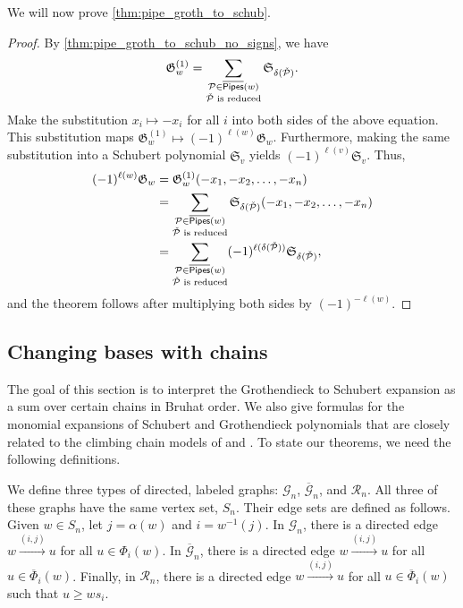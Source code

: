 \documentclass[12 pt]{amsart}
\newcommand{\addable}{\alpha}
\numberwithin{equation}{section}
\theoremstyle{remark}
\newcommand{\kpipes}{\overline{\sf Pipes}}
\newcommand{\demprod}{\delta}
\newcommand{\cotransitionperms}{\Phi}
\newcommand{\kcotransitionperms}{\overline{\Phi}}
\begin{document}
		We will now prove \cref{thm:pipe_groth_to_schub}.
		\thmpipeA*
		\begin{proof}
			By \cref{thm:pipe_groth_to_schub_no_signs}, we have \[\mathfrak{G}_w^{(1)} = \sum_{\substack{\mathcal{P} \in \kpipes(w)\\ \check{\mathcal{P}} \text{ is reduced}}}\mathfrak{S}_{\demprod(\check{\mathcal{P}})}.\]
			Make the substitution $x_i \mapsto -x_i$ for all $i$ into both sides of the above equation. 
			This substitution maps $\mathfrak{G}_w^{(1)} \mapsto (-1)^{\ell(w)}\mathfrak{G}_w$. 
			Furthermore, making the same substitution into a Schubert polynomial $\mathfrak S_v$ yields $(-1)^{\ell(v)}\mathfrak S_v$. 
			Thus, 
			\begin{align*}
			(-1)^{\ell(w)}\mathfrak{G}_w&=\mathfrak{G}_w^{(1)}(-x_1,-x_2,\ldots,-x_n)\\
			&=\sum_{\substack{\mathcal{P} \in \kpipes(w)\\ \check{\mathcal{P}} \text{ is reduced}}}\mathfrak{S}_{\demprod(\check{\mathcal{P}})}(-x_1,-x_2,\ldots,-x_n)\\
			&=\sum_{\substack{\mathcal{P} \in \kpipes(w)\\ \check{\mathcal{P}} \text{ is reduced}}}(-1)^{\ell(\demprod(\check{\mathcal{P}}))}\mathfrak{S}_{\demprod(\check{\mathcal{P}})},
			\end{align*}
			and the theorem follows after multiplying both sides by $(-1)^{-\ell(w)}$.
		\end{proof}
		
	
		
		\subsection{Changing bases with chains}
		\label{section:chains}
		
		The goal of this section is to interpret the Grothendieck to Schubert expansion as a sum over certain chains in Bruhat order. 
		We also give formulas for the monomial expansions of Schubert and Grothendieck polynomials that are closely related to the climbing chain models of \cite{Bergeron.Sottile} and \cite{Lenart.Robinson.Sottile}. 
		To state our theorems, we need the following definitions.
		
		We define three types of directed, labeled graphs: $\mathcal{G}_n$, $\overline{\mathcal{G}}_n$, and $\mathcal{R}_n$. 
		All three of these graphs have the same vertex set, $S_n$. 
		Their edge sets are defined as follows.
		Given $w\in S_n$, let $j=\addable(w)$ and $i=w^{-1}(j)$. 
		In $\mathcal{G}_n$, there is a directed edge $w\xrightarrow{(i,j)} u$ for all $u\in \cotransitionperms_i(w)$.
		In $\overline{\mathcal{G}}_n$, there is a directed edge $w\xrightarrow{(i,j)} u$ for all $u\in \kcotransitionperms_i(w)$.
		Finally, in $\mathcal{R}_n$, there is a directed edge $w\xrightarrow{(i,j)}u$ for all $u\in \kcotransitionperms_i(w)$ such that $u\geq ws_i$.		
		
\end{document}
